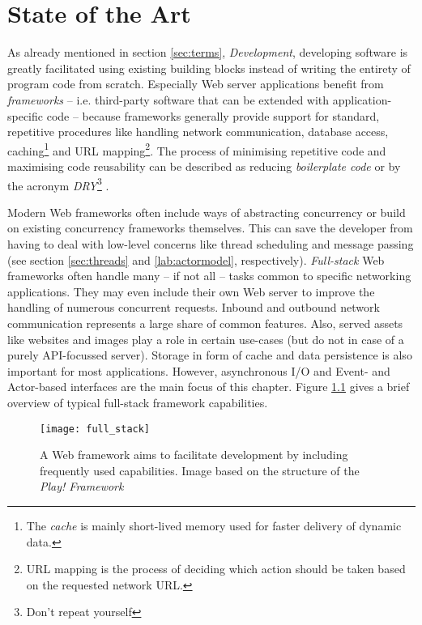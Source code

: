 \chapter{State of the Art}
\label{lab:sota}
As already mentioned in section \ref{sec:terms}, \textit{Development}, developing software is greatly facilitated using existing building blocks instead of writing the entirety of program code from scratch. Especially Web server applications benefit from \textit{frameworks} -- i.e. third-party software that can be extended with application-specific code -- because frameworks generally provide support for standard, repetitive procedures like handling network communication, database access, caching\footnote{The \textit{cache} is mainly short-lived memory used for faster delivery of dynamic data.} and URL mapping\footnote{URL mapping is the process of deciding which action should be taken based on the requested network URL.}. The process of minimising repetitive code and maximising code reusability can be described as reducing \textit{boilerplate code} or by the acronym \textit{DRY}\footnote{Don't repeat yourself} \cite[p. 149]{Scala} \cite[p. 1]{Orsini2008}.

Modern Web frameworks often include ways of abstracting concurrency or build on existing concurrency frameworks themselves. This can save the developer from having to deal with low-level concerns like thread scheduling and message passing (see section \ref{sec:threads} and \ref{lab:actormodel}, respectively). \textit{Full-stack} Web frameworks often handle many -- if not all -- tasks common to specific networking applications. They may even include their own Web server to improve the handling of numerous concurrent requests. Inbound and outbound network communication represents a large share of common features. Also, served assets like websites and images play a role in certain use-cases (but do not in case of a purely API-focussed server). Storage in form of cache and data persistence is also important for most applications. However, asynchronous I/O and Event- and Actor-based interfaces are the main focus of this chapter. Figure \ref{fig:full_stack} gives a brief overview of typical full-stack framework capabilities. 

\begin{figure}
\centering\small
\setlength{\tabcolsep}{0mm}
  \texttt{[image: full\_stack]}
\caption{
A Web framework aims to facilitate development by including frequently used capabilities. Image based on the structure of the \textit{Play! Framework} \cite{Scala}
}
\label{fig:full_stack}
\end{figure}

